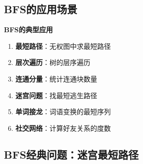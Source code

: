 \documentclass[12pt,a4paper]{article}
\begin{document}
	\subsection{BFS的应用场景}
	
	\begin{bluebox}
		\textbf{BFS的典型应用}
		
		\begin{enumerate}
			\item \textbf{最短路径}：无权图中求最短路径
			\item \textbf{层次遍历}：树的层序遍历
			\item \textbf{连通分量}：统计连通块数量
			\item \textbf{迷宫问题}：找最短逃生路径
			\item \textbf{单词接龙}：词语变换的最短序列
			\item \textbf{社交网络}：计算好友关系的度数
		\end{enumerate}
	\end{bluebox}
	
	\subsection{BFS经典问题：迷宫最短路径}
	
\end{document}
